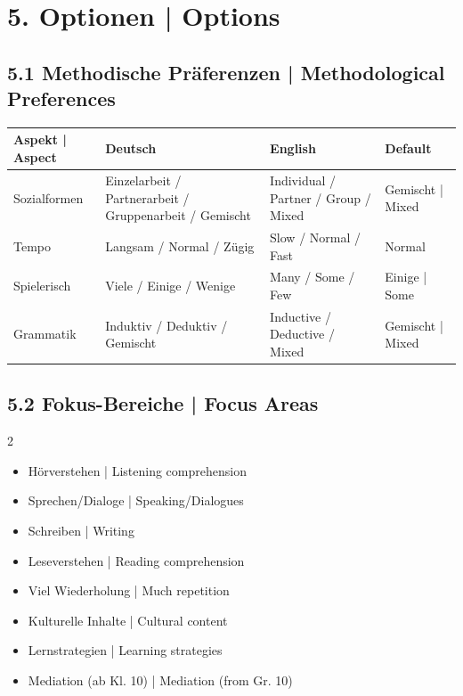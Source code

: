 \documentclass[11pt,a4paper]{article}
\begin{document}
\newpage

\section*{\textcolor{spanisch}{5. Optionen | Options}}

\subsection*{5.1 Methodische Präferenzen | Methodological Preferences}

\begin{tabularx}{\textwidth}{|l|X|X|l|}
\hline
\rowcolor{lightgray}
\textbf{Aspekt | Aspect} & \textbf{Deutsch} & \textbf{English} & \textbf{Default} \\
\hline
Sozialformen &
Einzelarbeit / Partnerarbeit / Gruppenarbeit / Gemischt &
Individual / Partner / Group / Mixed &
Gemischt | Mixed \\
\hline
Tempo &
Langsam / Normal / Zügig &
Slow / Normal / Fast &
Normal \\
\hline
Spielerisch &
Viele / Einige / Wenige &
Many / Some / Few &
Einige | Some \\
\hline
Grammatik &
Induktiv / Deduktiv / Gemischt &
Inductive / Deductive / Mixed &
Gemischt | Mixed \\
\hline
\end{tabularx}

\subsection*{5.2 Fokus-Bereiche | Focus Areas}

\begin{multicols}{2}
\begin{itemize}[leftmargin=*, nosep]
    \item[$\square$] Hörverstehen | Listening comprehension
    \item[$\square$] Sprechen/Dialoge | Speaking/Dialogues
    \item[$\square$] Schreiben | Writing
    \item[$\square$] Leseverstehen | Reading comprehension
    \item[$\square$] Viel Wiederholung | Much repetition
    \item[$\square$] Kulturelle Inhalte | Cultural content
    \item[$\square$] Lernstrategien | Learning strategies
    \item[$\square$] Mediation (ab Kl. 10) | Mediation (from Gr. 10)
\end{itemize}
\end{multicols}
\end{document}
